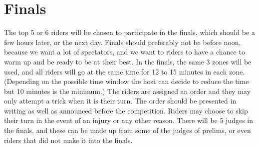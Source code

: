 \section{Finals}
The top 5 or 6 riders will be chosen to participate in the finals, which should be a few hours later, or the next day.
Finals should preferably not be before noon, because we want a lot of spectators, and we want to riders to have a chance to warm up and be ready to be at their best.
In the finals, the same 3 zones will be used, and all riders will go at the same time for 12 to 15 minutes in each zone.
(Depending on the possible time window the host can decide to reduce the time but 10 minutes is the minimum.)
The riders are assigned an order and they may only attempt a trick when it is their turn.
The order should be presented in writing as well as announced before the competition.
Riders may choose to skip their turn in the event of an injury or any other reason.
There will be 5 judges in the finals, and these can be made up from some of the judges of prelims, or even riders that did not make it into the finals.
